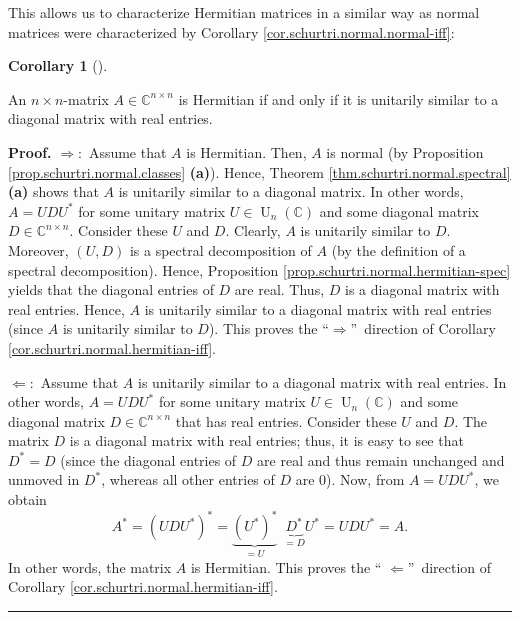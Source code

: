\documentclass[numbers=enddot,12pt,final,onecolumn,notitlepage]{scrartcl}%
\numberwithin{exer}{subsection}
\theoremstyle{definition}
\newtheorem{coro}[theo]{Corollary}
\newenvironment{corollary}[1][]
{\begin{coro}[#1]\begin{leftbar}}
{\end{leftbar}\end{coro}}
\newenvironment{proof}[1][Proof]{\noindent\textbf{#1.} }{\ \rule{0.5em}{0.5em}}
\begin{document}
This allows us to characterize Hermitian matrices in a similar way as normal
matrices were characterized by Corollary \ref{cor.schurtri.normal.normal-iff}:

\begin{corollary}
\label{cor.schurtri.normal.hermitian-iff}An $n\times n$-matrix $A\in
\mathbb{C}^{n\times n}$ is Hermitian if and only if it is unitarily similar to
a diagonal matrix with real entries.
\end{corollary}

\begin{proof}
$\Longrightarrow:$ Assume that $A$ is Hermitian. Then, $A$ is normal (by
Proposition \ref{prop.schurtri.normal.classes} \textbf{(a)}). Hence, Theorem
\ref{thm.schurtri.normal.spectral} \textbf{(a)} shows that $A$ is unitarily
similar to a diagonal matrix. In other words, $A=UDU^{\ast}$ for some unitary
matrix $U\in\operatorname*{U}\nolimits_{n}\left(  \mathbb{C}\right)  $ and
some diagonal matrix $D\in\mathbb{C}^{n\times n}$. Consider these $U$ and $D$.
Clearly, $A$ is unitarily similar to $D$. Moreover, $\left(  U,D\right)  $ is
a spectral decomposition of $A$ (by the definition of a spectral
decomposition). Hence, Proposition \ref{prop.schurtri.normal.hermitian-spec}
yields that the diagonal entries of $D$ are real. Thus, $D$ is a diagonal
matrix with real entries. Hence, $A$ is unitarily similar to a diagonal matrix
with real entries (since $A$ is unitarily similar to $D$). This proves the
\textquotedblleft$\Longrightarrow$\textquotedblright\ direction of Corollary
\ref{cor.schurtri.normal.hermitian-iff}. \medskip

$\Longleftarrow:$ Assume that $A$ is unitarily similar to a diagonal matrix
with real entries. In other words, $A=UDU^{\ast}$ for some unitary matrix
$U\in\operatorname*{U}\nolimits_{n}\left(  \mathbb{C}\right)  $ and some
diagonal matrix $D\in\mathbb{C}^{n\times n}$ that has real entries. Consider
these $U$ and $D$. The matrix $D$ is a diagonal matrix with real entries;
thus, it is easy to see that $D^{\ast}=D$ (since the diagonal entries of $D$
are real and thus remain unchanged and unmoved in $D^{\ast}$, whereas all
other entries of $D$ are $0$). Now, from $A=UDU^{\ast}$, we obtain
\[
A^{\ast}=\left(  UDU^{\ast}\right)  ^{\ast}=\underbrace{\left(  U^{\ast
}\right)  ^{\ast}}_{=U}\ \ \underbrace{D^{\ast}}_{=D}U^{\ast}=UDU^{\ast}=A.
\]
In other words, the matrix $A$ is Hermitian. This proves the \textquotedblleft%
$\Longleftarrow$\textquotedblright\ direction of Corollary
\ref{cor.schurtri.normal.hermitian-iff}.
\end{proof}
\end{document}
